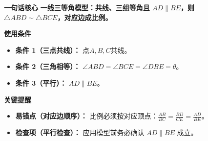 \begin{summarybox}
	\textbf{\textcolor{CSummary}{一句话核心}}
	\textbf{一线三等角模型：共线、三组等角且 $AD\parallel BE$，则 $\triangle ABD\sim\triangle BCE$，对应边成比例。}

	\medskip
	\textbf{\textcolor{CSummary}{使用条件}}
	\begin{itemize}[leftmargin=*, itemsep=0.5em, topsep=0.4em]
		\item \textbf{条件 1（三点共线）：} 点$A,B,C$共线。
		\item \textbf{条件 2（三角相等）：} $\angle ABD=\angle BCE=\angle DBE=\theta$。
		\item \textbf{条件 3（平行）：} $AD\parallel BE$。
	\end{itemize}

	\medskip
	\textbf{\textcolor{CSummary}{关键提醒}}
	\begin{itemize}[leftmargin=*, itemsep=0.5em, topsep=0.4em]
		\item \textbf{易错点（对应边顺序）：} 比例必须按对应顶点：$\frac{AB}{BC}=\frac{BD}{CE}=\frac{AD}{BE}$。
		\item \textbf{检查项（平行检查）：} 应用模型前务必确认 $AD\parallel BE$ 成立。
	\end{itemize}

\end{summarybox}
